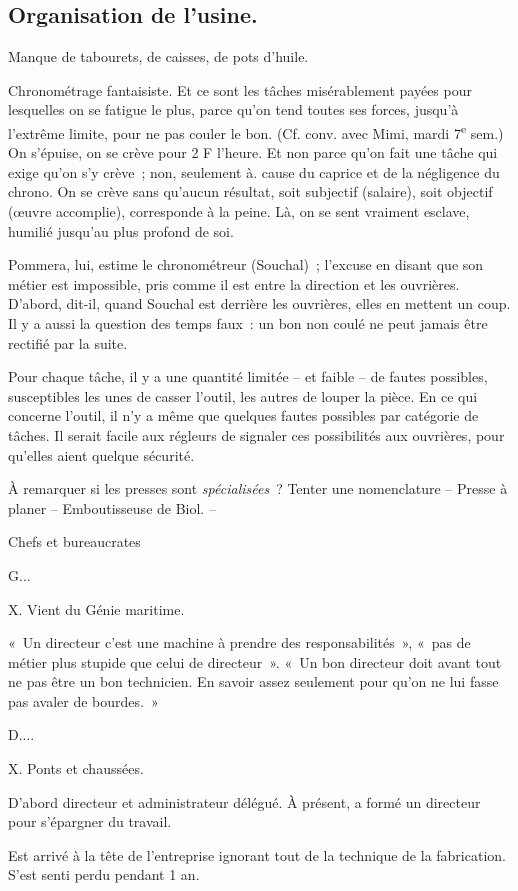 \documentclass[french,twoside]{book} %
\begin{document}
\subsection[Organisation de l'usine.]{Organisation de l'usine.}
\noindent \par
Manque de tabourets, de caisses, de pots d'huile.\par
Chronométrage fantaisiste. Et ce sont les tâches misérablement payées pour lesquelles on se fatigue le plus, parce qu'on tend toutes ses forces, jusqu'à l'extrême limite, pour ne pas couler le bon. (Cf. conv. avec Mimi, mardi 7\textsuperscript{e} sem.) On s'épuise, on se crève pour 2 F l'heure. Et non parce qu'on fait une tâche qui exige qu'on s'y crève ; non, seulement à. cause du caprice et de la négligence du chrono. On se crève sans qu'aucun résultat, soit subjectif (salaire), soit objectif (œuvre accomplie), corresponde à la peine. Là, on se sent vraiment esclave, humilié jusqu'au plus profond de soi.\par
Pommera, lui, estime le chronométreur (Souchal) ; l'excuse en disant que son métier est impossible, pris comme il est entre la direction et les ouvrières. D'abord, dit-il, quand Souchal est derrière les ouvrières, elles en mettent un coup. Il y a aussi la question des temps faux : un bon non coulé ne peut jamais être rectifié par la suite.\par
Pour chaque tâche, il y a une quantité limitée – et faible – de fautes possibles, susceptibles les unes de casser l'outil, les autres de louper la pièce. En ce qui concerne l'outil, il n'y a même que quelques fautes possibles par catégorie de tâches. Il serait facile aux régleurs de signaler ces possibilités aux ouvrières, pour qu'elles aient quelque sécurité.\par
À remarquer si les presses sont {\itshape spécialisées} ? Tenter une nomenclature – Presse à planer – Emboutisseuse de Biol. –\par
Chefs et bureaucrates\par
G...\par
X. Vient du Génie maritime.\par
« Un directeur c'est une machine à prendre des responsabilités », « pas de métier plus stupide que celui de directeur ». « Un bon directeur doit avant tout ne pas être un bon technicien. En savoir assez seulement pour qu'on ne lui fasse pas avaler de bourdes. »\par
D....\par
X. Ponts et chaussées.\par
D'abord directeur et administrateur délégué. À présent, a formé un directeur pour s'épargner du travail.\par
Est arrivé à la tête de l'entreprise ignorant tout de la technique de la fabrication. S'est senti perdu pendant 1 an.\par
\end{document}
